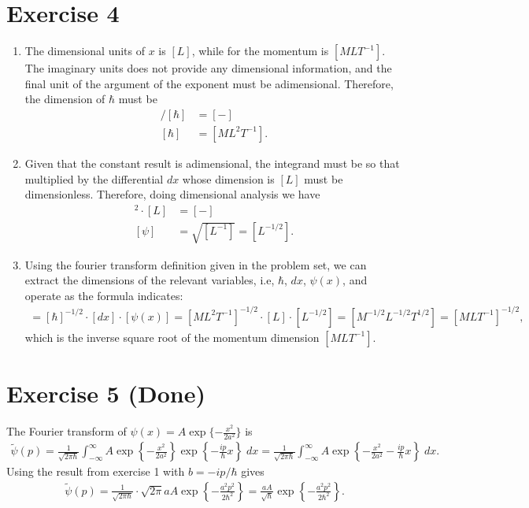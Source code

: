 \documentclass[letterpaper,11pt,twoside]{article}
\begin{document}
\section{Exercise 4}
\begin{enumerate}[itemsep=0pt,topsep=0pt,label=\alph*)]
  \item The dimensional units of $x$ is $[L]$, while for the momentum is $[MLT^{-1}]$. The imaginary units does not provide any dimensional information, and the final
  unit of the argument of the exponent must be adimensional. Therefore, the dimension of $\hbar$ must be 
  \begin{align*}
    [MLT^{-1}][L]/[\hbar]&=[-]\\
    [\hbar]&=[ML^2T^{-1}].
  \end{align*}
  \item Given that the constant result is adimensional, the integrand must be so that multiplied by the differential $dx$ whose dimension is $[L]$ must be 
  dimensionless. Therefore, doing dimensional analysis we have  
  \begin{align*}
    [\psi]^2\cdot[L]&=[-]\\
    [\psi]&=\sqrt{[L^{-1}]}=[L^{-1/2}].
  \end{align*}
  \item Using the fourier transform definition given in the problem set, we can extract the dimensions of the relevant variables, i.e, $\hbar$, $dx$, $\psi(x)$, and 
  operate as the formula indicates:
  \begin{align}
    [\tilde{\psi}(p)]=[\hbar]^{-1/2}\cdot[dx]\cdot[\psi(x)]=[ML^2T^{-1}]^{-1/2}\cdot[L]\cdot[L^{-1/2}]=[M^{-1/2}L^{-1/2}T^{1/2}]=[MLT^{-1}]^{-1/2},
  \end{align} 
  which is the inverse square root of the momentum dimension $[MLT^{-1}]$.
\end{enumerate}

\section{Exercise 5 (Done)}
The Fourier transform of $\psi(x)=A\exp\{-\frac{x^2}{2a^2}\}$ is 
\begin{align}
  \tilde{\psi}(p)=\frac{1}{\sqrt{2\pi\hbar}}\int_{-\infty}^\infty A\exp\left\{-\frac{x^2}{2a^2}\right\}\exp\left\{-\frac{ip}{\hbar}x\right\}\;dx=\frac{1}{\sqrt{2\pi\hbar}}\int_{-\infty}^\infty A\exp\left\{-\frac{x^2}{2a^2}-\frac{ip}{\hbar}x\right\}\;dx.
\end{align}
Using the result from exercise 1 with $b=-ip/\hbar$ gives
\begin{align}
  \tilde{\psi}(p)=\frac{1}{\sqrt{2\pi\hbar}}\cdot \sqrt{2\pi}aA\exp\left\{-\frac{a^2p^2}{2\hbar^2}\right\}=\frac{aA}{\sqrt{\hbar}}\exp\left\{-\frac{a^2p^2}{2\hbar^2}\right\}.
\end{align}
\end{document}
